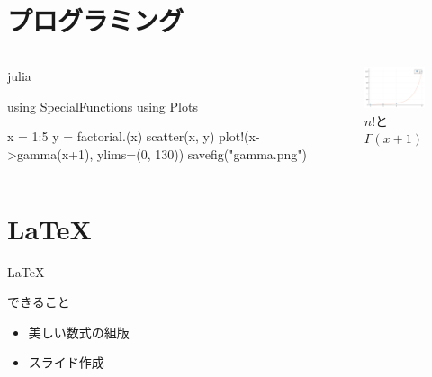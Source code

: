 \documentclass[dvipdfmx]{beamer}
\theoremstyle{break}
\begin{document}
\section{プログラミング}

\begin{frame}[fragile]
		\begin{columns}
				\begin{column}{0.45\textwidth}
						\begin{block}{julia}
\begin{semiverbatim}
using SpecialFunctions
using Plots

x = 1:5
y = factorial.(x)
scatter(x, y)
plot!(x->gamma(x+1), 
    ylims=(0, 130))
savefig("gamma.png")
\end{semiverbatim}
						\end{block}
				\end{column}
				\begin{column}{0.45\textwidth}
		\begin{figure}
				\centering
				\includegraphics[width=5cm]{./plot/gamma.png}
				\caption{$n!$と$\Gamma(x+1) $}
		\end{figure}
				\end{column}
		\end{columns}
\end{frame}
\section{LaTeX}
\begin{frame}{\LaTeX}
		\begin{block}{できること}
				\begin{itemize}
						\item 美しい数式の組版
						\item スライド作成
				\end{itemize}
		\end{block}
\end{frame}
\end{document}
